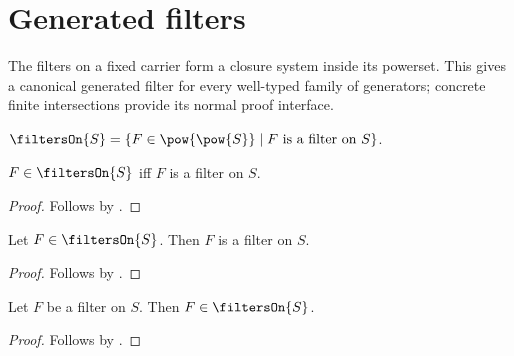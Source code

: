 \section{Generated filters}



The filters on a fixed carrier form a closure system inside its powerset.
This gives a canonical generated filter for every well-typed family of
generators; concrete finite intersections provide its normal proof interface.

\begin{definition}\label{filters_on}
    $\filtersOn{S}=\{F\in\pow{\pow{S}}\mid
        \text{$F$ is a filter on $S$}\}$.
\end{definition}

\begin{proposition}\label{filters_on_iff}
    $F\in\filtersOn{S}$ iff $F$ is a filter on $S$.
\end{proposition}
\begin{proof}
    Follows by
        .
\end{proof}

\begin{classification}\label{filters_on_member_is_filter}
    Let $F\in\filtersOn{S}$.
    Then $F$ is a filter on $S$.
\end{classification}
\begin{proof}
    Follows by .
\end{proof}

\begin{proposition}\label{filter_in_filters_on}
    Let $F$ be a filter on $S$.
    Then $F\in\filtersOn{S}$.
\end{proposition}
\begin{proof}
    Follows by .
\end{proof}

